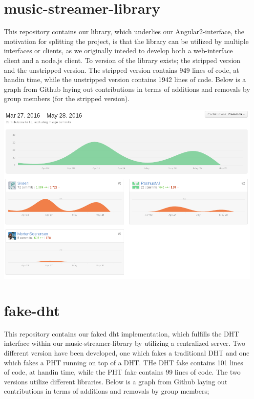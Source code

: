 \section{music-streamer-library}
This repository contains our library, which underlies our Angular2-interface,
the motivation for splitting the project, is that the library can be utilized 
by multiple interfaces or clients, as we originally inteded to develop both a
web-interface client and a node.js client.
\newline\newline
To version of the library exists; the stripped version and the unstripped
version. The stripped version contains 949 lines of code, at handin time, while
the unstripped version contains 1942 lines of code.
\newline\newline
Below is a graph from Github laying out contributions in terms of additions and
removals by group members (for the stripped version).

\includegraphics[width=\linewidth]{gfx/Music-streamer-library}

\section{fake-dht}
This repository contains our faked dht implementation, which fulfills the DHT
interface within our music-streamer-library by utilizing a centralized server.
\newline
Two different version have been developed, one which fakes a traditional DHT
and one which fakes a PHT running on top of a DHT.
\newline\newline
THe DHT fake contains 101 lines of code, at handin time, while the PHT fake 
contains 99 lines of code. The two versions utilize different libraries.
\newline\newline
Below is a graph from Github laying out contributions in terms of additions and
removals by group members;

